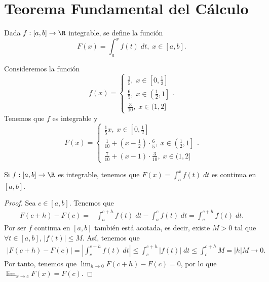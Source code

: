 \section{Teorema Fundamental del Cálculo}
\begin{fdefinition}[]
	\normalfont Dada $\displaystyle f :\left[a,b\right]  \to \R $ integrable, se define la función
	\[ F\left(x\right) = \int^{x}_{a} f\left(t\right) \; dt, \; x \in \left[a,b\right]  .\]
\end{fdefinition}
\begin{eg}
\normalfont Consideremos la función 
\[f\left(x\right) = 
\begin{cases}
	\frac{1}{5}, \; x \in \left[0,\frac{1}{2}\right] \\
	\frac{6}{5}, \; x \in \left(\frac{1}{2},1\right] \\
	\frac{3}{10}, \; x \in (1,2]
\end{cases}
.\]
Tenemos que $\displaystyle f $ es integrable y 
\[ F\left(x\right)= 
\begin{cases}
	\frac{1}{5}x, \; x \in \left[0,\frac{1}{2}\right] \\
	\frac{1}{10} + \left(x-\frac{1}{2}\right) \cdot \frac{6}{5}, \; x \in \left(\frac{1}{2},1\right] \\
	\frac{7}{10} + \left(x-1\right) \cdot \frac{3}{10}, \; x \in (1,2]
\end{cases}
.\]
\end{eg}
\begin{ftheorem}[]
	\normalfont Si $\displaystyle f : \left[a,b\right]  \to \R $ es integrable, tenemos que $\displaystyle F\left(x\right)= \int^{x}_{a} f\left(t\right) \; dt $ es continua en $\displaystyle \left[a,b\right]  $.
\end{ftheorem}
\begin{proof}
	Sea $\displaystyle c \in \left[a,b\right]  $. Tenemos que
	\[
	\begin{split}
		F\left(c + h\right)- F\left(c\right) = & \int^{c + h}_{a} f\left(t\right) \; dt - \int^{c}_{a} f\left(t\right) \; dt = \int^{c + h}_{c} f\left(t\right) \; dt .
	\end{split}
	\]
	Por ser $\displaystyle f $ continua en $\displaystyle \left[a,b\right]  $ también está acotada, es decir, existe $\displaystyle M > 0 $ tal que $\displaystyle \forall t \in [a,b] $, $\displaystyle \left|f\left(t\right)\right| \leq M $. Así, tenemos que
	\[
	\begin{split}
	\left|F\left(c+h\right)-F\left(c\right)\right| = \left|\int^{c + h}_{c} f\left(t\right) \; dt\right| \leq \int^{c + h}_{c} \left|f\left(t\right)\right| \; dt \leq \int^{c + h}_{c} M = \left|h\right| M \to 0 .
	\end{split}
	\]
	Por tanto, tenemos que $\displaystyle \lim_{h \to 0}F\left(c+h\right)-F\left(c\right) = 0 $, por lo que $\displaystyle \lim_{x \to c}F\left(x\right)= F\left(c\right) $.
\end{proof}
